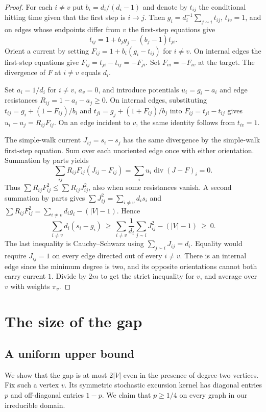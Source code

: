 \documentclass[11pt]{article}
\begin{document}
\begin{proof}
For each $i\ne v$ put $b_i=d_i/(d_i-1)$ and denote by $t_{ij}$ the
conditional hitting time given that the first step is $i\to j$.
Then $g_i=d_i^{-1}\sum_{j\sim i}t_{ij}$, $t_{iv}=1$, and on edges
whose endpoints differ from $v$ the first-step equations give
\[
 t_{ij}=1+b_jg_j-(b_j-1)t_{ji}.
\]
Orient a current by setting $F_{ij}=1+b_i(g_i-t_{ij})$ for $i\ne v$.
On internal edges the first-step equations give
$F_{ij}=t_{ji}-t_{ij}=-F_{ji}$. Set $F_{vi}=-F_{iv}$ at the target.
The divergence of $F$ at $i\ne v$ equals $d_i$.

Set $a_i=1/d_i$ for $i\ne v$, $a_v=0$, and introduce potentials
$u_i=g_i-a_i$ and edge resistances $R_{ij}=1-a_i-a_j\ge0$.
On internal edges, substituting
$t_{ij}=g_i+(1-F_{ij})/b_i$ and
$t_{ji}=g_j+(1+F_{ij})/b_j$ into $F_{ij}=t_{ji}-t_{ij}$ gives
$u_i-u_j=R_{ij}F_{ij}$. On an edge incident to $v$, the same identity
follows from $t_{iv}=1$.

The simple-walk current $J_{ij}=s_i-s_j$ has the same divergence by
the simple-walk first-step equation. Sum over each unoriented edge once
with either orientation. Summation by parts yields
\[
 \sum_{ij}R_{ij}F_{ij}(J_{ij}-F_{ij})
 =\sum_i u_i\operatorname{div}(J-F)_i=0.
\]
Thus $\sum R_{ij}F_{ij}^{2}\le\sum R_{ij}J_{ij}^{2}$, also when
some resistances vanish. A second summation by parts gives
$\sum J_{ij}^{2}=\sum_{i\ne v}d_i s_i$ and
$\sum R_{ij}F_{ij}^{2}=\sum_{i\ne v}d_i g_i-(|V|-1)$. Hence
\[
 \sum_{i\ne v} d_i(s_i-g_i)
 \ \ge\ \sum_{i\ne v}\frac1{d_i}\sum_{j\sim i}J_{ij}^{2}-(|V|-1)
 \ \ge\ 0 .
\]
The last inequality is Cauchy--Schwarz using
$\sum_{j\sim i}J_{ij}=d_i$. Equality would require $J_{ij}=1$ on
every edge directed out of every $i\ne v$. There is an internal
edge since the minimum degree is two, and its opposite orientations
cannot both carry current $1$. Divide by $2m$ to get the strict
inequality for $v$, and average over $v$ with weights $\pi_v$.
\end{proof}

\section{The size of the gap}
\subsection{A uniform upper bound}

We show that the gap is at most $2|V|$ even in the presence of
degree-two vertices. Fix such a vertex $v$. Its symmetric stochastic
excursion kernel has diagonal entries $p$ and off-diagonal entries
$1-p$. We claim that $p\ge 1/4$ on every graph in our irreducible
domain.
\end{document}
